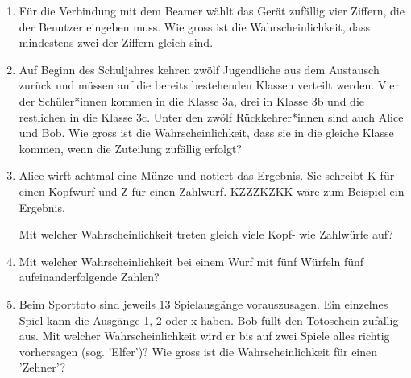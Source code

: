 \begin{ueb}
\begin{enumerate}
        \item Für die Verbindung mit dem Beamer wählt das Gerät zufällig vier Ziffern, die der Benutzer eingeben muss. Wie gross ist die Wahrscheinlichkeit, dass mindestens zwei der Ziffern gleich sind.

        \item Auf Beginn des Schuljahres kehren zwölf Jugendliche aus dem Austausch zurück und müssen auf die bereits bestehenden Klassen verteilt werden. Vier der Schüler*innen kommen in die Klasse 3a, drei in Klasse 3b und die restlichen in die Klasse 3c. Unter den zwölf Rückkehrer*innen sind auch Alice und Bob.
              Wie gross ist die Wahrscheinlichkeit, dass sie in die gleiche Klasse kommen, wenn die Zuteilung zufällig erfolgt?

        \item Alice wirft achtmal eine Münze und notiert das Ergebnis. Sie schreibt K für einen Kopfwurf und Z für einen Zahlwurf. KZZZKZKK wäre zum Beispiel ein Ergebnis.

              Mit welcher Wahrscheinlichkeit treten gleich viele Kopf- wie Zahlwürfe auf?

        \item Mit welcher Wahrscheinlichkeit %
              bei einem Wurf mit fünf Würfeln fünf aufeinanderfolgende Zahlen?

        \item Beim Sporttoto sind jeweils 13 Spielausgänge vorauszusagen. Ein einzelnes Spiel kann die Ausgänge 1, 2 oder x haben. Bob füllt den Totoschein zufällig aus. Mit welcher Wahrscheinlichkeit wird er bis auf zwei Spiele alles richtig vorhersagen (sog. 'Elfer')? Wie gross ist die Wahrscheinlichkeit für einen 'Zehner'?

    \end{enumerate}
\end{ueb}

\clearpage

